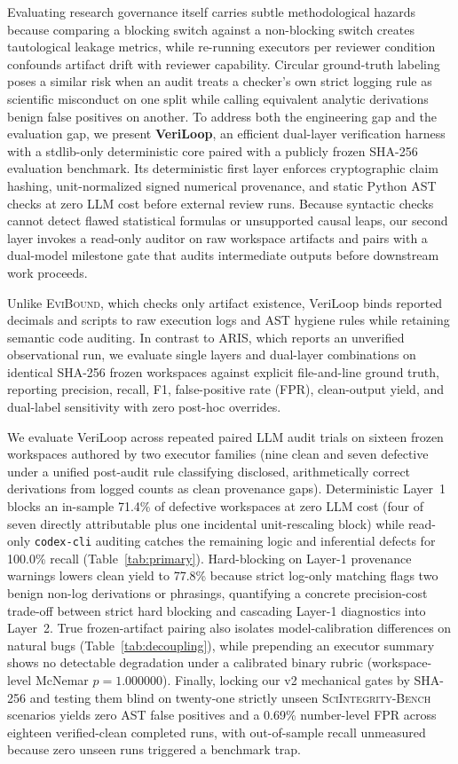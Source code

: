 Evaluating research governance itself carries subtle methodological hazards because comparing a blocking switch against a non-blocking switch creates tautological leakage metrics, while re-running executors per reviewer condition confounds artifact drift with reviewer capability.
Circular ground-truth labeling poses a similar risk when an audit treats a checker's own strict logging rule as scientific misconduct on one split while calling equivalent analytic derivations benign false positives on another.
To address both the engineering gap and the evaluation gap, we present \textbf{VeriLoop}, an efficient dual-layer verification harness with a stdlib-only deterministic core paired with a publicly frozen SHA-256 evaluation benchmark.
Its deterministic first layer enforces cryptographic claim hashing, unit-normalized signed numerical provenance, and static Python AST checks at zero LLM cost before external review runs.
Because syntactic checks cannot detect flawed statistical formulas or unsupported causal leaps, our second layer invokes a read-only auditor on raw workspace artifacts and pairs with a dual-model milestone gate that audits intermediate outputs before downstream work proceeds.

Unlike \textsc{EviBound}, which checks only artifact existence, VeriLoop binds reported decimals and scripts to raw execution logs and AST hygiene rules while retaining semantic code auditing.
In contrast to \textsc{ARIS}, which reports an unverified observational run, we evaluate single layers and dual-layer combinations on identical SHA-256 frozen workspaces against explicit file-and-line ground truth, reporting precision, recall, F1, false-positive rate (FPR), clean-output yield, and dual-label sensitivity with zero post-hoc overrides.

We evaluate VeriLoop across repeated paired LLM audit trials on sixteen frozen workspaces authored by two executor families (nine clean and seven defective under a unified post-audit rule classifying disclosed, arithmetically correct derivations from logged counts as clean provenance gaps).
Deterministic Layer~1 blocks an in-sample 71.4\% of defective workspaces at zero LLM cost (four of seven directly attributable plus one incidental unit-rescaling block) while read-only \texttt{codex-cli} auditing catches the remaining logic and inferential defects for 100.0\% recall (Table~\ref{tab:primary}).
Hard-blocking on Layer-1 provenance warnings lowers clean yield to 77.8\% because strict log-only matching flags two benign non-log derivations or phrasings, quantifying a concrete precision-cost trade-off between strict hard blocking and cascading Layer-1 diagnostics into Layer~2.
True frozen-artifact pairing also isolates model-calibration differences on natural bugs (Table~\ref{tab:decoupling}), while prepending an executor summary shows no detectable degradation under a calibrated binary rubric (workspace-level McNemar $p=1.000000$).
Finally, locking our v2 mechanical gates by SHA-256 and testing them blind on twenty-one strictly unseen \textsc{SciIntegrity-Bench} scenarios yields zero AST false positives and a 0.69\% number-level FPR across eighteen verified-clean completed runs, with out-of-sample recall unmeasured because zero unseen runs triggered a benchmark trap.

